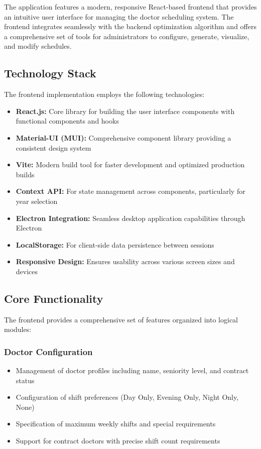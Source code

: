 \documentclass[12pt]{article}
\begin{document}
The application features a modern, responsive React-based frontend that provides an intuitive user interface for managing the doctor scheduling system. The frontend integrates seamlessly with the backend optimization algorithm and offers a comprehensive set of tools for administrators to configure, generate, visualize, and modify schedules.

\subsection{Technology Stack}

The frontend implementation employs the following technologies:
\begin{itemize}
    \item \textbf{React.js:} Core library for building the user interface components with functional components and hooks
    \item \textbf{Material-UI (MUI):} Comprehensive component library providing a consistent design system
    \item \textbf{Vite:} Modern build tool for faster development and optimized production builds
    \item \textbf{Context API:} For state management across components, particularly for year selection
    \item \textbf{Electron Integration:} Seamless desktop application capabilities through Electron
    \item \textbf{LocalStorage:} For client-side data persistence between sessions
    \item \textbf{Responsive Design:} Ensures usability across various screen sizes and devices
\end{itemize}

\subsection{Core Functionality}

The frontend provides a comprehensive set of features organized into logical modules:

\subsubsection{Doctor Configuration}
\begin{itemize}
    \item Management of doctor profiles including name, seniority level, and contract status
    \item Configuration of shift preferences (Day Only, Evening Only, Night Only, None)
    \item Specification of maximum weekly shifts and special requirements
    \item Support for contract doctors with precise shift count requirements
\end{itemize}
\end{document}
